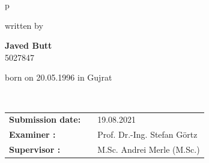 \begin{center}
\begin{tabular}{p{\textwidth}}
      
      \begin{center}
      written by
      \end{center}
      
      \begin{center}
      \large{\textbf{Javed Butt}} \\
      
      \large{5027847} \\
      \end{center}
      
      \begin{center}
      \large{born on 20.05.1996 in Gujrat}
      \end{center}
      \\
      
      \begin{center}
      \begin{tabular}{lll}
      \textbf{Submission date:} & & 19.08.2021\\
      \textbf{Examiner :} & & Prof. Dr.-Ing. Stefan Görtz\\
      \textbf{Supervisor :} & & M.Sc. Andrei Merle (M.Sc.)\\
      
      
      \end{tabular}
      \end{center}
      
      \end{tabular}
      \end{center}
      \thispagestyle{empty}




      